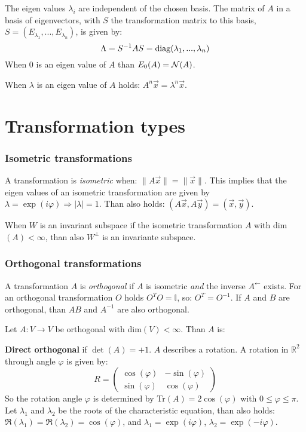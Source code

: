 The eigen values $\lambda_i$ are independent of the chosen basis.
The matrix of $A$ in a basis of eigenvectors, with $S$ the transformation matrix
to this basis, $S=(E_{\lambda_1},...,E_{\lambda_n})$, is given by:
\[
\Lambda=S^{-1}AS={\rm diag}(\lambda_1,...,\lambda_n)
\]
When 0 is an eigen value of $A$ than $E_0(A)={\cal N}(A)$.
 
When $\lambda$ is an eigen value of $A$ holds: $A^n\vec{x}=\lambda^n\vec{x}$.

\section{Transformation types}
\subsubsection{Isometric transformations}
A transformation is {\it isometric} when: $\|A\vec{x}\|=\|\vec{x}\|$. This
implies that the eigen values of an isometric transformation are given by
$\lambda=\exp(i\varphi)\Rightarrow|\lambda|=1$. Than also holds:
$(A\vec{x},A\vec{y})=(\vec{x},\vec{y})$.
 
When $W$ is an invariant subspace if the isometric transformation $A$ with
dim$(A)<\infty$, than also $W^\perp$ is an invariante subspace.

\subsubsection{Orthogonal transformations}
A transformation $A$ is {\it orthogonal} if $A$ is isometric {\it and}
the inverse $A^\leftarrow$ exists. For an orthogonal transformation $O$ holds
$O^TO= \mathbb{I}$, so: $O^T=O^{-1}$. If $A$ and $B$ are orthogonal, than $AB$ and
$A^{-1}$ are also orthogonal.
 
Let $A:V\rightarrow V$ be orthogonal with dim$(V)<\infty$. Than $A$ is:
 
{\bf Direct orthogonal} if $\det(A)=+1$. $A$ describes a rotation.
A rotation in $ \mathbb{R}^2$ through angle $\varphi$ is given by:
\[
R=
\left(\begin{array}{cc}
\cos(\varphi)&-\sin(\varphi)\\
\sin(\varphi)&\cos(\varphi)
\end{array}\right)
\]
So the rotation angle $\varphi$ is determined by Tr$(A)=2\cos(\varphi)$
with $0\leq\varphi\leq\pi$. Let $\lambda_1$ and $\lambda_2$ be the roots of
the characteristic equation, than also holds:
$\Re(\lambda_1)=\Re(\lambda_2)=\cos(\varphi)$, and $\lambda_1=\exp(i\varphi)$,
$\lambda_2=\exp(-i\varphi)$.
 
